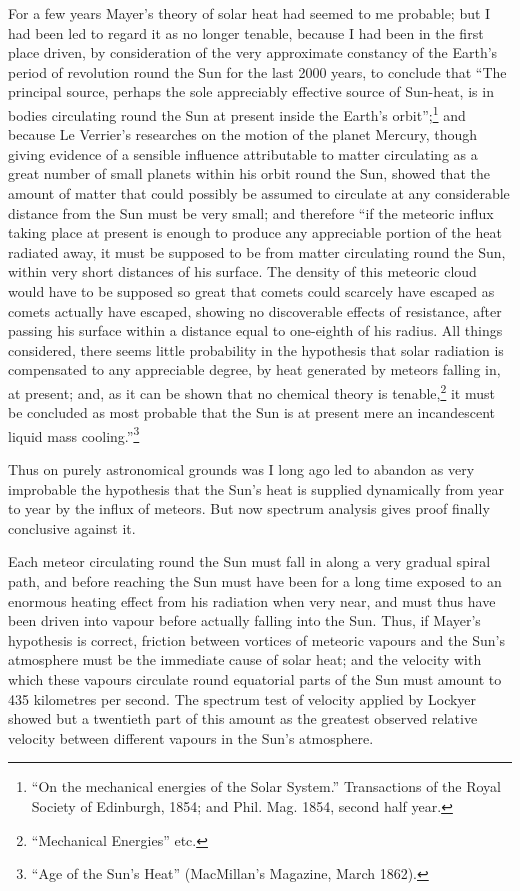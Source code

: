 \documentclass[a4paper, 11pt, oneside, english]{article}
\begin{document}
For a few years Mayer's theory of solar heat had seemed to me probable; but I had been led to regard it as no longer tenable, because I had been in the first place driven, by consideration of the very approximate constancy of the Earth's period of revolution round the Sun for the last 2000 years, to conclude that ``The principal source, perhaps the sole appreciably effective source of Sun-heat, is in bodies circulating round the Sun at present inside the Earth's orbit'';\footnote{``On the mechanical energies of the Solar System.'' Transactions of the Royal Society of Edinburgh, 1854; and Phil. Mag. 1854, second half year.} and because Le Verrier's researches on the motion of the planet Mercury, though giving evidence of a sensible influence attributable to matter circulating as a great number of small planets within his orbit round the Sun, showed that the amount of matter that could possibly be assumed to circulate at any considerable distance from the Sun must be very small; and therefore ``if the meteoric influx taking place at present is enough to produce any appreciable portion of the heat radiated away, it must be supposed to be from matter circulating round the Sun, within very short distances of his surface. The density of this meteoric cloud would have to be supposed so great that comets could scarcely have escaped as comets actually have escaped, showing no discoverable effects of resistance, after passing his surface within a distance equal to one-eighth of his radius. All things considered, there seems little probability in the hypothesis that solar radiation is compensated to any appreciable degree, by heat generated by meteors falling in, at present; and, as it can be shown that no chemical theory is tenable,\footnote{``Mechanical Energies'' etc.} it must be concluded as most probable that the Sun is at present mere an incandescent liquid mass cooling.''\footnote{``Age of the Sun's Heat'' (MacMillan's Magazine, March 1862).}

Thus on purely astronomical grounds was I long ago led to abandon as very improbable the hypothesis that the Sun's heat is supplied dynamically from year to year by the influx of meteors. But now spectrum analysis gives proof finally conclusive against it.

Each meteor circulating round the Sun must fall in along a very gradual spiral path, and before reaching the Sun must have been for a long time exposed to an enormous heating effect from his radiation when very near, and must thus have been driven into vapour before actually falling into the Sun. Thus, if Mayer's hypothesis is correct, friction between vortices of meteoric vapours and the Sun's atmosphere must be the immediate cause of solar heat; and the velocity with which these vapours circulate round equatorial parts of the Sun must amount to 435 kilometres per second. The spectrum test of velocity applied by Lockyer showed but a twentieth part of this amount as the greatest observed relative velocity between different vapours in the Sun's atmosphere.
\end{document}
